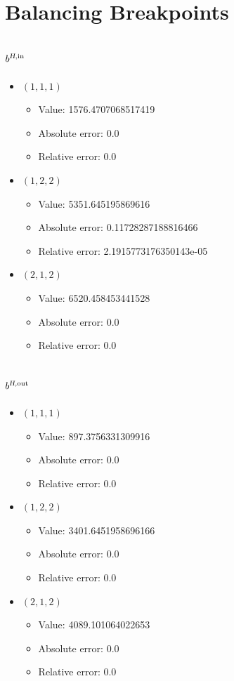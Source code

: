 \documentclass{article}%
\begin{document}
\section{Balancing Breakpoints}%
\subsection{$b^{\textsl{H},\text{in}}$}%
\begin{itemize}%
	\item $(1, 1, 1)$%
	\begin{itemize}%
		\item Value: 1576.4707068517419%
		\item Absolute error: 0.0%
		\item Relative error: 0.0%
	\end{itemize}%
	\item $(1, 2, 2)$%
	\begin{itemize}%
		\item Value: 5351.645195869616%
		\item Absolute error: 0.11728287188816466%
		\item Relative error: 2.1915773176350143e-05%
	\end{itemize}%
	\item $(2, 1, 2)$%
	\begin{itemize}%
		\item Value: 6520.458453441528%
		\item Absolute error: 0.0%
		\item Relative error: 0.0%
	\end{itemize}%
\end{itemize}%
\subsection{$b^{\textsl{H},\text{out}}$}%
\begin{itemize}%
	\item $(1, 1, 1)$%
	\begin{itemize}%
		\item Value: 897.3756331309916%
		\item Absolute error: 0.0%
		\item Relative error: 0.0%
	\end{itemize}%
	\item $(1, 2, 2)$%
	\begin{itemize}%
		\item Value: 3401.6451958696166%
		\item Absolute error: 0.0%
		\item Relative error: 0.0%
	\end{itemize}%
	\item $(2, 1, 2)$%
	\begin{itemize}%
		\item Value: 4089.101064022653%
		\item Absolute error: 0.0%
		\item Relative error: 0.0%
	\end{itemize}%
\end{itemize}%
\end{document}

